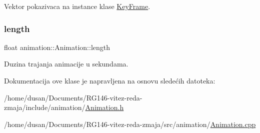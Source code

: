 Vektor pokazivaca na instance klase \hyperlink{classanimation_1_1KeyFrame}{Key\+Frame}. 

\mbox{\label{classanimation_1_1Animation_a2e08946f67829d6907b204f70d94a6ec}} 
\subsubsection{\texorpdfstring{length}{length}}
{\footnotesize\ttfamily float animation\+::\+Animation\+::length\hspace{0.3cm}{\ttfamily [private]}}



Duzina trajanja animacije u sekundama. 



Dokumentacija ove klase je napravljena na osnovu sledećih datoteka\+:\begin{DoxyCompactItemize}
\item 
/home/dusan/\+Documents/\+R\+G146-\/vitez-\/reda-\/zmaja/include/animation/\hyperlink{Animation_8h}{Animation.\+h}\item 
/home/dusan/\+Documents/\+R\+G146-\/vitez-\/reda-\/zmaja/src/animation/\hyperlink{Animation_8cpp}{Animation.\+cpp}\end{DoxyCompactItemize}
